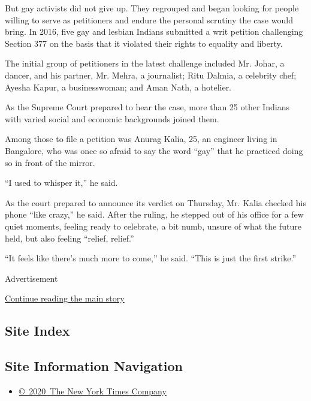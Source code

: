 But gay activists did not give up. They regrouped and began looking for
people willing to serve as petitioners and endure the personal scrutiny
the case would bring. In 2016, five gay and lesbian Indians submitted a
writ petition challenging Section 377 on the basis that it violated
their rights to equality and liberty.

The initial group of petitioners in the latest challenge included Mr.
Johar, a dancer, and his partner, Mr. Mehra, a journalist; Ritu Dalmia,
a celebrity chef; Ayesha Kapur, a businesswoman; and Aman Nath, a
hotelier.

As the Supreme Court prepared to hear the case, more than 25 other
Indians with varied social and economic backgrounds joined them.

Among those to file a petition was Anurag Kalia, 25, an engineer living
in Bangalore, who was once so afraid to say the word ``gay'' that he
practiced doing so in front of the mirror.

``I used to whisper it,'' he said.

As the court prepared to announce its verdict on Thursday, Mr. Kalia
checked his phone ``like crazy,'' he said. After the ruling, he stepped
out of his office for a few quiet moments, feeling ready to celebrate, a
bit numb, unsure of what the future held, but also feeling ``relief,
relief.''

``It feels like there's much more to come,'' he said. ``This is just the
first strike.''

Advertisement

\protect\hyperlink{after-bottom}{Continue reading the main story}

\hypertarget{site-index}{%
\subsection{Site Index}\label{site-index}}

\hypertarget{site-information-navigation}{%
\subsection{Site Information
Navigation}\label{site-information-navigation}}

\begin{itemize}
\tightlist
\item
  \href{https://help.nytimes.com/hc/en-us/articles/115014792127-Copyright-notice}{©~2020~The
  New York Times Company}
\end{itemize}

